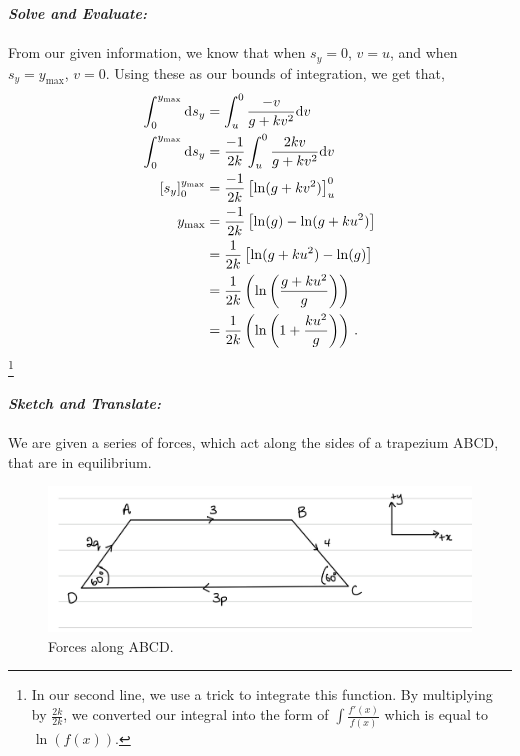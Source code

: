 \begin{subquestions}
\textbf{\textit{Solve and Evaluate:}} \\ \\
From our given information, we know that when $s_y=0$, $v=u$, and when $s_y=y_{\text{max}}$, $v=0$. Using these as our bounds of integration, we get that,
\begin{align}
	\int_{0}^{y_{\text{max}}} \mathrm{d} s_y & = \int_{u}^{0} \frac{-v}{g+kv^2}\mathrm{d} v \nonumber \\
	\int_{0}^{y_{\text{max}}} \mathrm{d} s_y & = \frac{-1}{2k}\int_{u}^{0} \frac{2kv}{g+kv^2}\mathrm{d} v \nonumber \\
	\left[s_y\right]_0^{y_{\text{max}}} & = \frac{-1}{2k} \left[\ln(g+kv^2)\right]_u^0 \nonumber \\
	y_{\text{max}} & = \frac{-1}{2k} \left[\ln(g)-\ln(g+ku^2)\right] \nonumber \\
	               & = \frac{1}{2k} \left[\ln(g+ku^2)-\ln(g)\right] \nonumber \\
	               & = \frac{1}{2k} \left(\ln\left(\frac{g+ku^2}{g}\right)\right) \nonumber \\
	 			   & = \frac{1}{2k} \left(\ln\left(1 + \frac{ku^2}{g}\right)\right) \,.
\end{align} \footnote{In our second line, we use a trick to integrate this function. By multiplying by $\frac{2k}{2k}$, we converted our integral into the form of $\int \frac{f'(x)}{f(x)}$ which is equal to $\ln(f(x))$.} 


\subquestion

\textbf{\textit{Sketch and Translate:}} \\ \\
We are given a series of forces, which act along the sides of a trapezium ABCD, that are in equilibrium.
\begin{figure}[H]
	\begin{center}
		\includegraphics[scale=0.25]{../2007/figures/2008Mq6Diagram2}
		\caption{\label{2008M:q6:Sketch2} Forces along ABCD.}
	\end{center}
\end{figure}





\end{subquestions}
